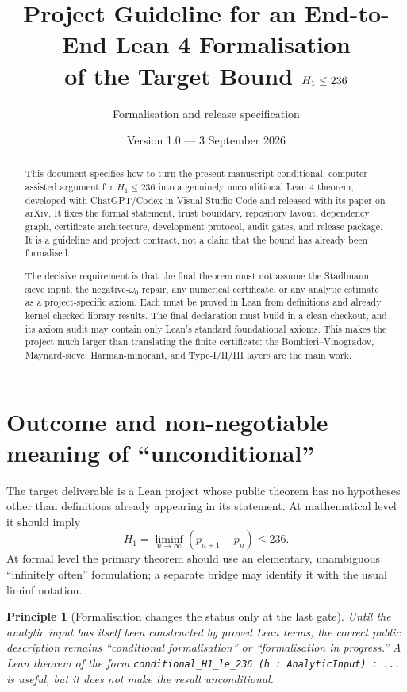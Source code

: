\documentclass[11pt]{article}
\title{Project Guideline for an End-to-End Lean 4 Formalisation\\
of the Target Bound \(\Hone\leq 236\)}
\author{Formalisation and release specification}
\date{Version 1.0 --- 3 September 2026}
\newtheorem{principle}{Principle}
\newcommand{\Hone}{H_1}
\newcommand{\leanname}[1]{\texttt{#1}}
\begin{document}
\maketitle

\begin{abstract}
This document specifies how to turn the present manuscript-conditional,
computer-assisted argument for \(\Hone\leq236\) into a genuinely
unconditional Lean 4 theorem, developed with ChatGPT/Codex in Visual Studio
Code and released with its paper on arXiv.  It fixes the formal statement,
trust boundary, repository layout, dependency graph, certificate architecture,
development protocol, audit gates, and release package.  It is a guideline and
project contract, not a claim that the bound has already been formalised.

The decisive requirement is that the final theorem must not assume the
Stadlmann sieve input, the negative-\(\omega_0\) repair, any numerical
certificate, or any analytic estimate as a project-specific axiom.  Each must
be proved in Lean from definitions and already kernel-checked library results.
The final declaration must build in a clean checkout, and its axiom audit may
contain only Lean's standard foundational axioms.  This makes the project much
larger than translating the finite certificate: the Bombieri--Vinogradov,
Maynard-sieve, Harman-minorant, and Type-I/II/III layers are the main work.
\end{abstract}

\tableofcontents

\section{Outcome and non-negotiable meaning of ``unconditional''}

The target deliverable is a Lean project whose public theorem has no hypotheses
other than definitions already appearing in its statement.  At mathematical
level it should imply
\[
  \Hone=\liminf_{n\to\infty}(p_{n+1}-p_n)\leq236.
\]
At formal level the primary theorem should use an elementary, unambiguous
``infinitely often'' formulation; a separate bridge may identify it with the
usual liminf notation.

\begin{principle}[Formalisation changes the status only at the last gate]
Until the analytic input has itself been constructed by proved Lean terms, the
correct public description remains ``conditional formalisation'' or
``formalisation in progress.''  A Lean theorem of the form
\leanname{conditional\_H1\_le\_236 (h : AnalyticInput) : ...} is useful, but it
does not make the result unconditional.
\end{principle}
\end{document}
